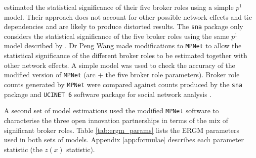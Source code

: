 \citet{gould1989structures} estimated the statistical significance of their five broker roles using a simple $p^1$ model. Their approach does not account for other possible network effects and tie dependencies and are likely to produce distorted results. The \texttt{sna} package only considers the statistical significance of the five broker roles using the same $p^1$ model described by \citet{gould1989structures}. Dr Peng Wang made modifications to \texttt{MPNet} to allow the statistical significance of the different broker roles to be estimated together with other network effects. A simple model was used to check the accuracy of the modified version of \texttt{MPNet} (arc + the five broker role parameters). Broker role counts generated by \texttt{MPNet} were compared against counts produced by the \texttt{sna} package \citep{butts2016sna} and \texttt{UCINET 6} software package for social network analysis \citep{borgatti2002ucinet}. \medskip

A second set of model estimations used the modified \texttt{MPNet} software to characterise the three open innovation partnerships in terms of the mix of significant broker roles. Table \ref{tab:ergm_params} lists the ERGM parameters used in both sets of models. Appendix \ref{app:formulae} describes each parameter statistic (the $z(x)$ statistic).

